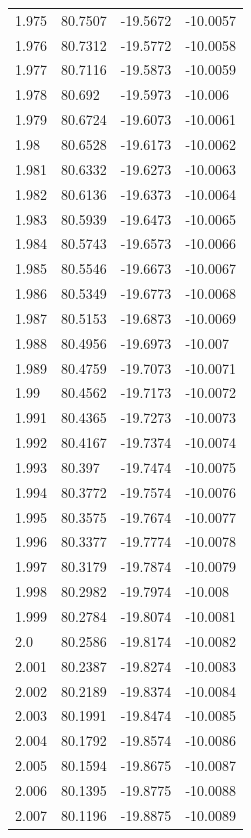 \begin{tabular}{llll}
1.975 & 80.7507 & -19.5672 & -10.0057 \\
1.976 & 80.7312 & -19.5772 & -10.0058 \\
1.977 & 80.7116 & -19.5873 & -10.0059 \\
1.978 & 80.692 & -19.5973 & -10.006 \\
1.979 & 80.6724 & -19.6073 & -10.0061 \\
1.98 & 80.6528 & -19.6173 & -10.0062 \\
1.981 & 80.6332 & -19.6273 & -10.0063 \\
1.982 & 80.6136 & -19.6373 & -10.0064 \\
1.983 & 80.5939 & -19.6473 & -10.0065 \\
1.984 & 80.5743 & -19.6573 & -10.0066 \\
1.985 & 80.5546 & -19.6673 & -10.0067 \\
1.986 & 80.5349 & -19.6773 & -10.0068 \\
1.987 & 80.5153 & -19.6873 & -10.0069 \\
1.988 & 80.4956 & -19.6973 & -10.007 \\
1.989 & 80.4759 & -19.7073 & -10.0071 \\
1.99 & 80.4562 & -19.7173 & -10.0072 \\
1.991 & 80.4365 & -19.7273 & -10.0073 \\
1.992 & 80.4167 & -19.7374 & -10.0074 \\
1.993 & 80.397 & -19.7474 & -10.0075 \\
1.994 & 80.3772 & -19.7574 & -10.0076 \\
1.995 & 80.3575 & -19.7674 & -10.0077 \\
1.996 & 80.3377 & -19.7774 & -10.0078 \\
1.997 & 80.3179 & -19.7874 & -10.0079 \\
1.998 & 80.2982 & -19.7974 & -10.008 \\
1.999 & 80.2784 & -19.8074 & -10.0081 \\
2.0 & 80.2586 & -19.8174 & -10.0082 \\
2.001 & 80.2387 & -19.8274 & -10.0083 \\
2.002 & 80.2189 & -19.8374 & -10.0084 \\
2.003 & 80.1991 & -19.8474 & -10.0085 \\
2.004 & 80.1792 & -19.8574 & -10.0086 \\
2.005 & 80.1594 & -19.8675 & -10.0087 \\
2.006 & 80.1395 & -19.8775 & -10.0088 \\
2.007 & 80.1196 & -19.8875 & -10.0089 \\

\end{tabular}
